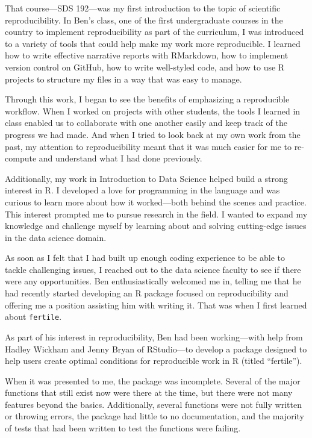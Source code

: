 \documentclass[12pt,twoside]{reedthesis}
\begin{document}
That course---SDS 192---was my first introduction to the topic of scientific reproducibility. In Ben's class, one of the first undergraduate courses in the country to implement reproducibility as part of the curriculum, I was introduced to a variety of tools that could help make my work more reproducible. I learned how to write effective narrative reports with RMarkdown, how to implement version control on GitHub, how to write well-styled code, and how to use R projects to structure my files in a way that was easy to manage.

Through this work, I began to see the benefits of emphasizing a reproducible workflow. When I worked on projects with other students, the tools I learned in class enabled us to collaborate with one another easily and keep track of the progress we had made. And when I tried to look back at my own work from the past, my attention to reproducibility meant that it was much easier for me to re-compute and understand what I had done previously.

Additionally, my work in Introduction to Data Science helped build a strong interest in R. I developed a love for programming in the language and was curious to learn more about how it worked---both behind the scenes and practice. This interest prompted me to pursue research in the field. I wanted to expand my knowledge and challenge myself by learning about and solving cutting-edge issues in the data science domain.

As soon as I felt that I had built up enough coding experience to be able to tackle challenging issues, I reached out to the data science faculty to see if there were any opportunities. Ben enthusiastically welcomed me in, telling me that he had recently started developing an R package focused on reproducibility and offering me a position assisting him with writing it. That was when I first learned about \texttt{fertile}.

As part of his interest in reproducibility, Ben had been working---with help from Hadley Wickham and Jenny Bryan of RStudio---to develop a package designed to help users create optimal conditions for reproducible work in R (titled ``fertile'').

When it was presented to me, the package was incomplete. Several of the major functions that still exist now were there at the time, but there were not many features beyond the basics. Additionally, several functions were not fully written or throwing errors, the package had little to no documentation, and the majority of tests that had been written to test the functions were failing.
\end{document}
